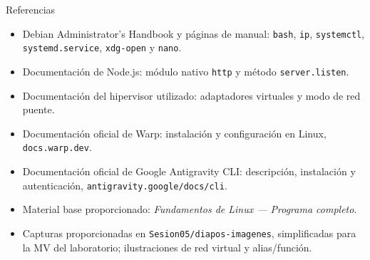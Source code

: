 \documentclass[aspectratio=169,10pt,c]{beamer}
\begin{document}
\begin{frame}{Referencias}
\scriptsize
\begin{itemize}\setlength\itemsep{4pt}
  \item Debian Administrator's Handbook y páginas de manual: \texttt{bash}, \texttt{ip}, \texttt{systemctl}, \texttt{systemd.service}, \texttt{xdg-open} y \texttt{nano}.
  \item Documentación de Node.js: módulo nativo \texttt{http} y método \texttt{server.listen}.
  \item Documentación del hipervisor utilizado: adaptadores virtuales y modo de red puente.
  \item Documentación oficial de Warp: instalación y configuración en Linux, \texttt{docs.warp.dev}.
  \item Documentación oficial de Google Antigravity CLI: descripción, instalación y autenticación, \texttt{antigravity.google/docs/cli}.
  \item Material base proporcionado: \emph{Fundamentos de Linux — Programa completo}.
  \item Capturas proporcionadas en \texttt{Sesion05/diapos-imagenes}, simplificadas para la MV del laboratorio; ilustraciones de red virtual y alias/función.
\end{itemize}
\end{frame}
\end{document}
